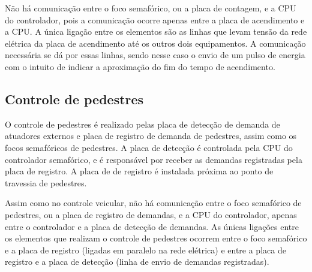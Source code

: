 Não há comunicação entre o foco semafórico, ou a placa de contagem, e a \ac{CPU} do controlador, pois a comunicação ocorre apenas entre a placa de acendimento e a \ac{CPU}. A única ligação entre os elementos são as linhas que levam tensão da rede elétrica da placa de acendimento até os outros dois equipamentos. A comunicação necessária se dá por essas linhas, sendo nesse caso o envio de um pulso de energia com o intuito de indicar a aproximação do fim do tempo de acendimento.

\subsection{Controle de pedestres}

O controle de pedestres é realizado pelas placa de detecção de demanda de atuadores externos e placa de registro de demanda de pedestres, assim como os focos semafóricos de pedestres. A placa de detecção é controlada pela \ac{CPU} do controlador semafórico, e é responsável por receber as demandas registradas pela placa de registro. A placa de de registro é instalada próxima ao ponto de travessia de pedestres.

Assim como no controle veicular, não há comunicação entre o foco semafórico de pedestres, ou a placa de registro de demandas, e a \ac{CPU} do controlador, apenas entre o controlador e a placa de detecção de demandas. As únicas ligações entre os elementos que realizam o controle de pedestres ocorrem entre o foco semafórico e a placa de registro (ligadas em paralelo na rede elétrica) e entre a placa de registro e a placa de detecção (linha de envio de demandas registradas). 
